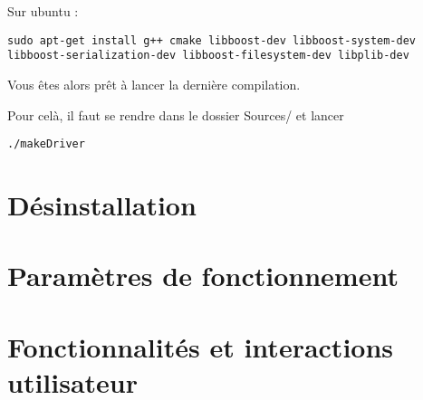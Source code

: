 \documentclass[a4paper,12pt]{article}
\begin{document}
  Sur ubuntu : 
    \begin{lstlisting}
sudo apt-get install g++ cmake libboost-dev libboost-system-dev libboost-serialization-dev libboost-filesystem-dev libplib-dev
    \end{lstlisting}
    
    Vous êtes alors prêt à lancer la dernière compilation.
    
    Pour celà, il faut se rendre dans le dossier Sources/ et lancer
    \begin{lstlisting}
./makeDriver
    \end{lstlisting}
    
  \section{Désinstallation}
  
 
  \section{Paramètres de fonctionnement}


  
  
  
  \section{Fonctionnalités et interactions utilisateur}

  
  



\end{document}
